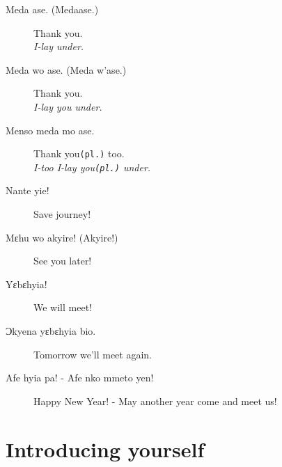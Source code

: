 \documentclass[%
 fontsize=11pt,%
 a5paper,pagesize,
 paper=a5,%
 DIV=9,%
 parskip=half*,%
 twoside=true,
 pointlessnumbers
]{scrbook}%
\begin{document}
\begin{description}
  
  \item[Meda ase. (Medaase.)] Thank you. \\
    \textit{I-lay under.}
  \item[Meda wo ase. (Meda w'ase.)] Thank you. \\
    \textit{I-lay you under.}
  \item[Menso meda mo ase.] Thank you\texttt{(pl.)} too. \\
    \textit{I-too I-lay you\texttt{(pl.)} under.}
  \item[Nante yie!] Save journey!
  \item[Mεhu wo akyire! (Akyire!)] See you later!
  \item[Yɛbɛhyia!] We will meet!
  \item[Ɔkyena yɛbɛhyia bio.] Tomorrow we'll meet again.
  \item[Afe hyia pa! - Afe nko mmeto yen!] Happy New Year! - May another year come and meet us!

\end{description}

\chapter{Introducing yourself}
\end{document}
